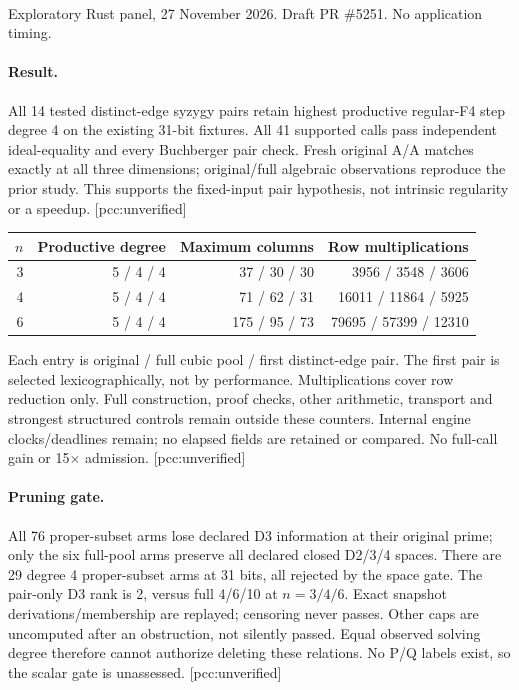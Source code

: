 \documentclass[10pt,a4paper]{article}
\begin{document}
\\[4pt]
{\small Exploratory Rust panel, 27 November 2026. Draft PR \#5251. No application timing.}
\paragraph{Result.} All 14 tested distinct-edge syzygy pairs retain highest
productive regular-F4 step degree 4 on the existing 31-bit fixtures. All 41
supported calls pass independent ideal-equality and every Buchberger pair check.
Fresh original A/A matches exactly at all three dimensions; original/full
algebraic observations reproduce the prior study. This supports the fixed-input
pair hypothesis, not intrinsic regularity or a speedup. [pcc:unverified]
\begin{center}\begin{tabular}{rrrr}\toprule
$n$ & Productive degree & Maximum columns & Row multiplications\\\midrule
3 & 5 / 4 / 4 & 37 / 30 / 30 & 3956 / 3548 / 3606\\
4 & 5 / 4 / 4 & 71 / 62 / 31 & 16011 / 11864 / 5925\\
6 & 5 / 4 / 4 & 175 / 95 / 73 & 79695 / 57399 / 12310\\
\bottomrule\end{tabular}\end{center}
\noindent Each entry is original / full cubic pool / first distinct-edge pair.
The first pair is selected lexicographically, not by performance. Multiplications
cover row reduction only. Full construction, proof checks, other arithmetic,
transport and strongest structured controls remain outside these counters.
Internal engine clocks/deadlines remain; no elapsed fields are retained or
compared. No full-call gain or 15$\times$ admission. [pcc:unverified]
\paragraph{Pruning gate.} All 76 proper-subset arms lose declared D3 information
at their original prime; only the six full-pool arms preserve all declared
closed D2/3/4 spaces. There are 29 degree 4 proper-subset arms at 31 bits, all
rejected by the space gate. The pair-only D3 rank is 2, versus full 4/6/10 at
$n=3/4/6$. Exact snapshot derivations/membership are replayed; censoring never
passes. Other caps are uncomputed after an obstruction, not silently passed.
Equal observed solving degree therefore cannot authorize deleting these
relations. No P/Q labels exist, so the scalar gate is unassessed. [pcc:unverified]
\end{document}
